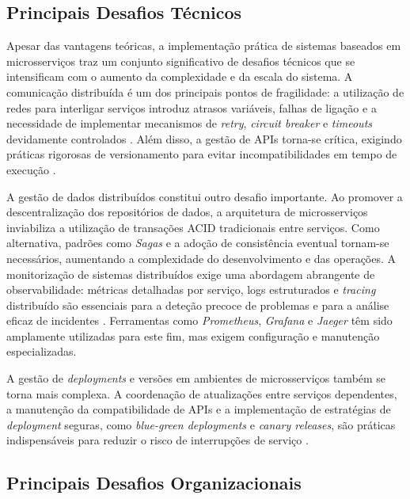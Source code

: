 \clearpage

\subsection{Principais Desafios Técnicos}

Apesar das vantagens teóricas, a implementação prática de sistemas baseados em microsserviços traz um conjunto significativo de desafios técnicos que se intensificam com o aumento da complexidade e da escala do sistema. A comunicação distribuída é um dos principais pontos de fragilidade: a utilização de redes para interligar serviços introduz atrasos variáveis, falhas de ligação e a necessidade de implementar mecanismos de \textit{retry}, \textit{circuit breaker} e \textit{timeouts} devidamente controlados \cite{Nygard2018,Newman2015}. Além disso, a gestão de APIs torna-se crítica, exigindo práticas rigorosas de versionamento para evitar incompatibilidades em tempo de execução \cite{Richardson2018}.

A gestão de dados distribuídos constitui outro desafio importante. Ao promover a descentralização dos repositórios de dados, a arquitetura de microsserviços inviabiliza a utilização de transações ACID tradicionais entre serviços. Como alternativa, padrões como \textit{Sagas} e a adoção de consistência eventual tornam-se necessários, aumentando a complexidade do desenvolvimento e das operações. A monitorização de sistemas distribuídos exige uma abordagem abrangente de observabilidade: métricas detalhadas por serviço, logs estruturados e \textit{tracing} distribuído são essenciais para a deteção precoce de problemas e para a análise eficaz de incidentes \cite{Burns2015}. Ferramentas como \textit{ Prometheus}, \textit{ Grafana} e \textit{ Jaeger} têm sido amplamente utilizadas para este fim, mas exigem configuração e manutenção especializadas.

A gestão de \textit{deployments} e versões em ambientes de microsserviços também se torna mais complexa. A coordenação de atualizações entre serviços dependentes, a manutenção da compatibilidade de APIs e a implementação de estratégias de \textit{deployment} seguras, como \textit{blue-green deployments} e \textit{canary releases}, são práticas indispensáveis para reduzir o risco de interrupções de serviço \cite{Humble2010}.

\subsection{Principais Desafios Organizacionais}

